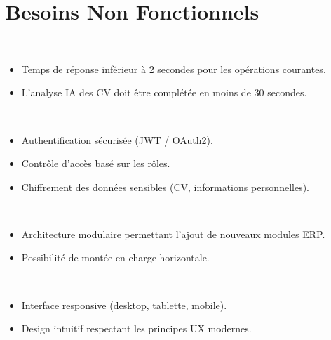 \documentclass[11pt,a4paper]{report}
\begin{document}
\chapter{Besoins Non Fonctionnels}

\begin{tcolorbox}[enhanced, colback=lightgray, colframe=primarycolor, arc=3mm, boxrule=1pt, breakable]
    \begin{description}[style=nextline, font=\bfseries\color{primarycolor}]
        \item[Performance] ~\\[-2.7em]
              \begin{itemize}
                  \item Temps de réponse inférieur à 2 secondes pour les opérations courantes.
                  \item L'analyse IA des CV doit être complétée en moins de 30 secondes.
              \end{itemize}

        \item[Sécurité] ~\\[-2.7em]
              \begin{itemize}
                  \item Authentification sécurisée (JWT / OAuth2).
                  \item Contrôle d'accès basé sur les rôles.
                  \item Chiffrement des données sensibles (CV, informations personnelles).
              \end{itemize}

        \item[Scalabilité] ~\\[-2.7em]
              \begin{itemize}
                  \item Architecture modulaire permettant l'ajout de nouveaux modules ERP.
                  \item Possibilité de montée en charge horizontale.
              \end{itemize}

        \item[Ergonomie] ~\\[-2.7em]
              \begin{itemize}
                  \item Interface responsive (desktop, tablette, mobile).
                  \item Design intuitif respectant les principes UX modernes.
              \end{itemize}


\end{description}
\end{tcolorbox}
\end{document}
